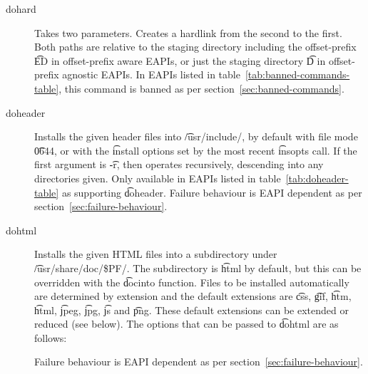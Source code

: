 \begin{description}
\item[dohard] Takes two parameters. Creates a hardlink from the second to the first. Both paths are
    relative to the staging directory including the offset-prefix \t{ED} in offset-prefix aware
    EAPIs, or just the staging directory \t{D} in offset-prefix agnostic EAPIs. In EAPIs listed
    in table~\ref{tab:banned-commands-table}, this command is banned as per
    section~\ref{sec:banned-commands}.

\item[doheader]  Installs the given header files into \t{/usr/include/},
    by default with file mode \t{0644}, or with the \t{install} options set by the most recent
    \t{insopts} call. If the first argument is \t{-r}, then operates recursively, descending
    into any directories given.
    Only available in EAPIs listed in table~\ref{tab:doheader-table} as supporting \t{doheader}.
    Failure behaviour is EAPI dependent as per section~\ref{sec:failure-behaviour}.

\item[dohtml] Installs the given HTML files into a subdirectory under \t{/usr/share/doc/\$PF/}.
The subdirectory is \t{html} by default, but this can be overridden with the \t{docinto} function.
Files to be installed automatically are determined by extension and the default extensions are
\t{css}, \t{gif}, \t{htm}, \t{html}, \t{jpeg}, \t{jpg}, \t{js} and \t{png}. These default extensions
can be extended or reduced (see below). The options that can be passed to \t{dohtml} are as follows:

    Failure behaviour is EAPI dependent as per section~\ref{sec:failure-behaviour}.


\end{description}
